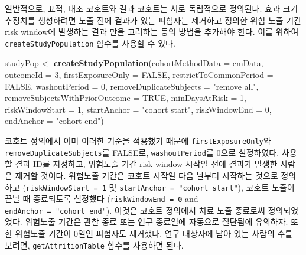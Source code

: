 \documentclass[10.5pt]{book}
\newenvironment{Shaded}{\begin{snugshade}}{\end{snugshade}}
\newcommand{\KeywordTok}[1]{\textcolor[rgb]{0.13,0.29,0.53}{\textbf{#1}}}
\newcommand{\DataTypeTok}[1]{\textcolor[rgb]{0.13,0.29,0.53}{#1}}
\newcommand{\DecValTok}[1]{\textcolor[rgb]{0.00,0.00,0.81}{#1}}
\newcommand{\StringTok}[1]{\textcolor[rgb]{0.31,0.60,0.02}{#1}}
\newcommand{\OtherTok}[1]{\textcolor[rgb]{0.56,0.35,0.01}{#1}}
\newcommand{\NormalTok}[1]{#1}
\theoremstyle{definition}
\theoremstyle{definition}
\theoremstyle{definition}
\theoremstyle{remark}
\begin{document}
일반적으로, 표적, 대조 코호트와 결과 코호트는 서로 독립적으로 정의된다.
효과 크기 추정치를 생성하려면 노출 전에 결과가 있는 피험자는 제거하고
정의한 위험 노출 기간 risk window에 발생하는 결과 만을 고려하는 등의
방법을 추가해야 한다. 이를 위하여 \texttt{createStudyPopulation} 함수를
사용할 수 있다.

\begin{Shaded}
\begin{Highlighting}[]
\NormalTok{studyPop <-}\StringTok{ }\KeywordTok{createStudyPopulation}\NormalTok{(}\DataTypeTok{cohortMethodData =}\NormalTok{ cmData,}
                                  \DataTypeTok{outcomeId =} \DecValTok{3}\NormalTok{,}
                                  \DataTypeTok{firstExposureOnly =} \OtherTok{FALSE}\NormalTok{,}
                                  \DataTypeTok{restrictToCommonPeriod =} \OtherTok{FALSE}\NormalTok{,}
                                  \DataTypeTok{washoutPeriod =} \DecValTok{0}\NormalTok{,}
                                  \DataTypeTok{removeDuplicateSubjects =} \StringTok{"remove all"}\NormalTok{,}
                                  \DataTypeTok{removeSubjectsWithPriorOutcome =} \OtherTok{TRUE}\NormalTok{,}
                                  \DataTypeTok{minDaysAtRisk =} \DecValTok{1}\NormalTok{,}
                                  \DataTypeTok{riskWindowStart =} \DecValTok{1}\NormalTok{,}
                                  \DataTypeTok{startAnchor =} \StringTok{"cohort start"}\NormalTok{,}
                                  \DataTypeTok{riskWindowEnd =} \DecValTok{0}\NormalTok{,}
                                  \DataTypeTok{endAnchor =} \StringTok{"cohort end"}\NormalTok{)}
\end{Highlighting}
\end{Shaded}

코호트 정의에서 이미 이러한 기준을 적용했기 때문에
\texttt{firstExposureOnly}와 \texttt{removeDuplicateSubjects}를 FALSE로,
\texttt{washoutPeriod}를 0으로 설정하였다. 사용할 결과 ID를 지정하고,
위험노출 기간 risk window 시작일 전에 결과가 발생한 사람은 제거할
것이다. 위험노출 기간은 코호트 시작일 다음 날부터 시작하는 것으로
정의하고 (\texttt{riskWindowStart\ =\ 1} 및
\texttt{startAnchor\ =\ "cohort\ start"}), 코호트 노출이 끝날 때
종료되도록 설정했다 (\texttt{riskWindowEnd\ =\ 0} and
\texttt{endAnchor\ =\ "cohort\ end"}). 이것은 코호트 정의에서 치료 노출
종료로써 정의되었었다. 위험노출 기간은 관찰 종료 또는 연구 종료일에
자동으로 절단됨에 유의하자. 또한 위험노출 기간이 0일인 피험자도
제거했다. 연구 대상자에 남아 있는 사람의 수를 보려면,
\texttt{getAttritionTable} 함수를 사용하면 된다.
\end{document}
